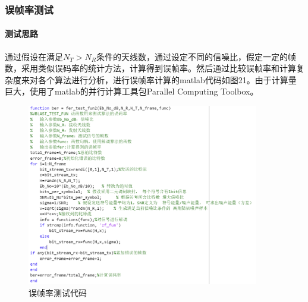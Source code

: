 \documentclass[a4paper,12pt]{article}
\begin{document}
	\subsubsection{误帧率测试}
	\paragraph{测试思路}
	通过假设在满足$N_T>N_R$条件的天线数，通过设定不同的信噪比，假定一定的帧数，采用类似误码率的统计方法，计算得到误帧率。然后通过比较误帧率和计算复杂度来对各个算法进行分析，进行误帧率计算的matlab代码如图21。由于计算量巨大，使用了matlab的并行计算工具包Parallel Computing Toolbox。\par
	\begin{figure}[h]
		\centering
		\includegraphics[width=0.9\textwidth]{22.png}
		\caption{误帧率测试代码}
	\end{figure}
\end{document}
